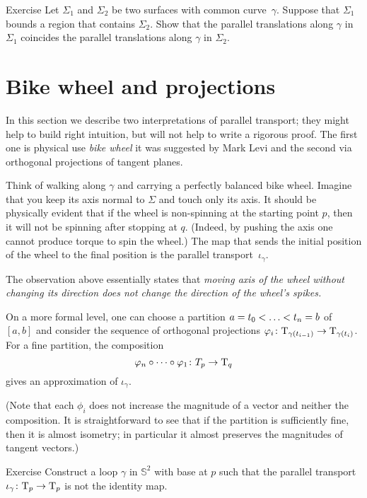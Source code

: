 \begin{thm}{Exercise}\label{ex:parallel-transport-support}
Let $\Sigma_1$ and $\Sigma_2$ be two surfaces with common curve~$\gamma$.
Suppose that $\Sigma_1$ bounds a region that contains $\Sigma_2$.
Show that the parallel translations along $\gamma$ in $\Sigma_1$ 
coincides the parallel translations along $\gamma$ in $\Sigma_2$. 
\end{thm}

\section{Bike wheel and projections}

In this section we describe two interpretations of parallel transport;
they might help to build right intuition, but will not help to write a rigorous proof.
The first one is physical use \emph{bike wheel} it was suggested by Mark Levi \cite{levi} and the second via orthogonal projections of tangent planes.

Think of walking along $\gamma$ and carrying a perfectly balanced bike wheel.
Imagine that you keep its axis normal to $\Sigma$ and touch only its axis.
It should be physically evident that if the wheel is non-spinning at the starting point $p$, then it will not be spinning after stopping at $q$.
(Indeed, by pushing the axis one cannot produce torque to spin the wheel.)
The map that sends the initial position of the wheel to the final position is  the parallel transport~$\iota_\gamma$.

The observation above essentially states that {}\emph{moving axis of the wheel without changing its direction does not change the direction of the wheel's spikes.}

On a more formal level, one can choose a partition $a=t_0<\dots\z<t_n=b$ of $[a,b]$
and consider the sequence of orthogonal projections $\varphi_i\colon\mathrm{T}_{\gamma(t_{i-1})}\to\mathrm{T}_{\gamma(t_i)}$.
For a fine partition, the composition 
\[\phi_n\circ\dots\circ\phi_1\:T_p\z\to\T_q\]
gives an approximation of $\iota_\gamma$.

(Note that each $\phi_i$ does not increase the magnitude of a vector and neither the composition.
It is straightforward to see that if the partition is sufficiently fine, then it is almost isometry; in particular it almost preserves the magnitudes of tangent vectors.)

\begin{thm}{Exercise}\label{ex:holonomy=not0}
Construct a loop $\gamma$ in $\mathbb{S}^2$ with base at $p$ such that the parallel transport $\iota_\gamma\colon\mathrm{T}_p\to\mathrm{T}_p$ is not the identity map.
\end{thm}

